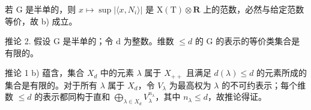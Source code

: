若 G 是半单的，则 \(x \mapsto \sup |\langle x, N_{i} \rangle|\) 是 \(\mathrm{X(T)} \otimes \mathbf{R}\) 上的范数，必然与给定范数等价，故 b) 成立。

推论 2. 假设 G 是半单的；令 d 为整数。维数 \(\leq d\) 的 G 的表示的等价类集合是有限的。

推论 1 b) 蕴含，集合 \(X_{d}\) 中的元素 \(\lambda\) 属于 \(X_{++}\) 且满足 \(d(\lambda) \leq d\) 的元素所成的集合是有限的。对于所有 \(\lambda\) 属于 \(X_{d}\)，令 \(V_{\lambda}\) 为最高权为 \(\lambda\) 的不可约表示；每个维数 \(\leq d\) 的表示都同构于直和 \(\bigoplus_{\lambda \in X_{d}} V_{\lambda}^{n_{\lambda}}\)，其中 \(n_{\lambda} \leq d\)，故推论得证。

